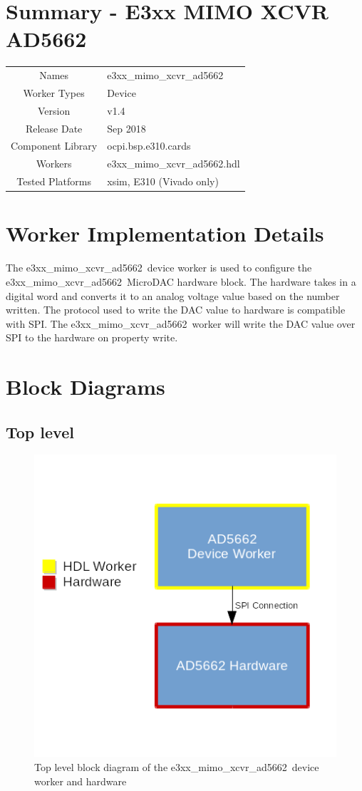 \documentclass{article}
\author{} %
\date{Version \docVersion} %
\title{\docTitle}
\def\docVersion{1.4}
\def\comp{e3xx\_mimo\_xcvr\_ad5662}
\def\Comp{E3xx MIMO XCVR AD5662}
\def\comp{e3xx\_mimo\_xcvr\_ad5662}
\def\Comp{E3xx MIMO XCVR AD5662}
\begin{document}
\section*{Summary - \Comp}
\begin{tabular}{|c|M{13.5cm}|}
	\hline
	                  &                                      \\
	\hline
	Names              & \comp                        \\
	\hline
	Worker Types       & Device \\
	\hline
	Version           & v\docVersion \\
	\hline
	Release Date      & Sep 2018 \\
	\hline
	Component Library & ocpi.bsp.e310.cards \\
	\hline
	Workers           & \comp.hdl                \\
	\hline
	Tested Platforms  & xsim, E310 (Vivado only)                       \\
	\hline
\end{tabular}

\section*{Worker Implementation Details}
The \comp\ device worker is used to configure the \comp\ MicroDAC hardware block. The hardware takes in a digital word and converts it to an analog voltage value based on the number written. The protocol used to write the DAC value to hardware is compatible with SPI. The \comp\ worker will write the DAC value over SPI to the hardware on property write.
\section*{Block Diagrams}
\subsection*{Top level}
\begin{figure}[ht]
	\centerline{\includegraphics[scale=0.75]{top_level_diagram}}
	\caption{Top level block diagram of the \comp\ device worker and hardware}
	\label{fig:tb}
\end{figure}
\flushleft
\end{document}

